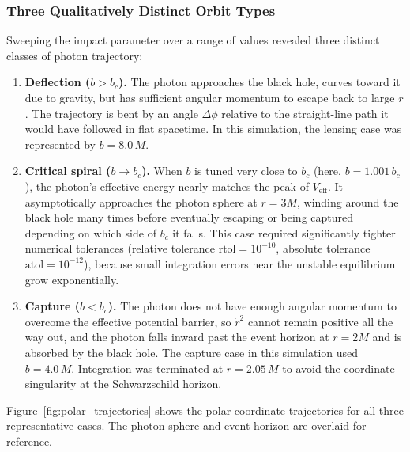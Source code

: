 \documentclass[12pt,a4paper]{article}
\begin{document}
\subsubsection{Three Qualitatively Distinct Orbit Types}
Sweeping the impact parameter over a range of values revealed three distinct classes of photon trajectory:

\begin{enumerate}

    \item \textbf{Deflection ($b > b_c$).} The photon approaches the black hole, curves toward it due to gravity, but has sufficient angular momentum to escape back to large $r$. The trajectory is bent by an angle $\Delta\phi$ relative to the straight-line path it would have followed in flat spacetime. In this simulation, the lensing case was represented by $b = 8.0\,M$.

    \item \textbf{Critical spiral ($b \to b_c$).} When $b$ is tuned very close to $b_c$  (here, $b = 1.001\,b_c$), the photon's effective energy nearly matches the peak of $V_\mathrm{eff}$. It asymptotically approaches the photon sphere at $r = 3M$, winding around the black hole many times before eventually escaping or being captured depending on which side of $b_c$ it falls. This case required significantly tighter numerical tolerances (relative tolerance $\mathrm{rtol} = 10^{-10}$, absolute tolerance $\mathrm{atol} = 10^{-12}$), because small integration errors near the unstable equilibrium grow exponentially.

    \item \textbf{Capture ($b < b_c$).} The photon does not have enough angular momentum to
    overcome the effective potential barrier, so $\dot{r}^2$ cannot remain positive all the way out, and the photon falls inward past the event horizon at $r = 2M$ and is absorbed by the black hole. The capture case in this simulation used $b = 4.0\,M$. Integration was terminated at $r = 2.05\,M$ to avoid the coordinate singularity at the Schwarzschild horizon.

\end{enumerate}

Figure~\ref{fig:polar_trajectories} shows the polar-coordinate trajectories for all three representative cases. The photon sphere and event horizon are overlaid for reference.
\end{document}
